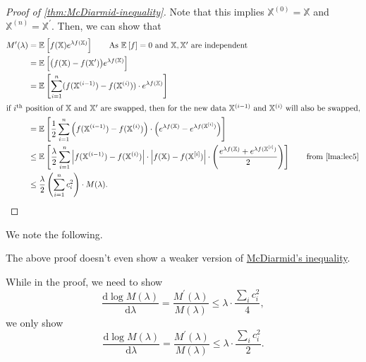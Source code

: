 \begin{proof}[Proof of \autoref{thm:McDiarmid-inequality}]
	Note that this implies \(\mathbb{X}^{(0)} = \mathbb{X}\) and \(\mathbb{X}^{(n)} = \mathbb{X}^{\prime} \). Then, we can show that
	\begin{align*}
		M^{\prime} (\lambda )
		 & = \mathbb{E}_{}\left[f(\mathbb{X}) e^{\lambda f(\mathbb{X})} \right] \tag*{As \(\mathbb{E}_{}\left[f \right] = 0\) and \(\mathbb{X}, \mathbb{X}^{\prime} \) are independent}                                                                                                                                                     \\
		 & = \mathbb{E}_{}\left[\big(f(\mathbb{X}) - f(\mathbb{X}^{\prime} )\big) e^{\lambda f(\mathbb{X})}\right]                                                                                                                                                                                                                          \\
		 & = \mathbb{E}_{}\left[ \sum_{i=1}^{n} (f(\mathbb{X}^{(i-1)}) - f(\mathbb{X}^{(i)})) \cdot e^{\lambda f(\mathbb{X})}\right]                                                                                                                                                                                                        \\
		\intertext{if \(i^{\text{th} }\) position of \(\mathbb{X}\) and \(\mathbb{X}^{\prime} \) are swapped, then for the new data \(\mathbb{X}^{(i-1)}\) and \(\mathbb{X}^{(i)}\) will also be swapped,}
		 & = \mathbb{E}_{}\left[\frac{1}{2} \sum_{i=1}^{n} \left( f(\mathbb{X}^{(i-1)}) - f(\mathbb{X}^{(i)}) \right) \cdot \left( e^{\lambda f(\mathbb{X})} - e^{\lambda f(\mathbb{X}^{[i]})} \right)  \right]                                                                                                                             \\
		 & \leq \mathbb{E}_{}\left[\frac{\lambda }{2} \sum_{i=1}^{n} \left\vert f(\mathbb{X}^{(i-1)}) - f(\mathbb{X}^{(i)}) \right\vert \cdot \left\vert f(\mathbb{X}) - f(\mathbb{X}^{[i]}) \right\vert \cdot \left( \frac{e^{\lambda f(\mathbb{X})} + e^{\lambda f(\mathbb{X}^{[i]})}}{2} \right)  \right] \tag*{from \autoref{lma:lec5}} \\
		 & \leq \frac{\lambda}{2}\left( \sum_{i=1}^{n} c_i^2 \right) \cdot M(\lambda ).
	\end{align*}
\end{proof}

We note the following.

\begin{note}
	The above proof doesn't even show a weaker version of \hyperref[thm:McDiarmid-inequality]{McDiarmid's inequality}.
\end{note}
\begin{explanation}
	While in the proof, we need to show
	\[
		\frac{\mathrm{d}\log M(\lambda )}{\mathrm{d}\lambda } = \frac{M^{\prime} (\lambda )}{M(\lambda )} \leq \lambda \cdot \frac{\sum_{i} c_i^2}{4},
	\]
	we only show
	\[
		\frac{\mathrm{d}\log M(\lambda )}{\mathrm{d}\lambda } = \frac{M^{\prime} (\lambda )}{M(\lambda )} \leq \lambda \cdot \frac{\sum_{i} c_i^2}{2}.
	\]
\end{explanation}

